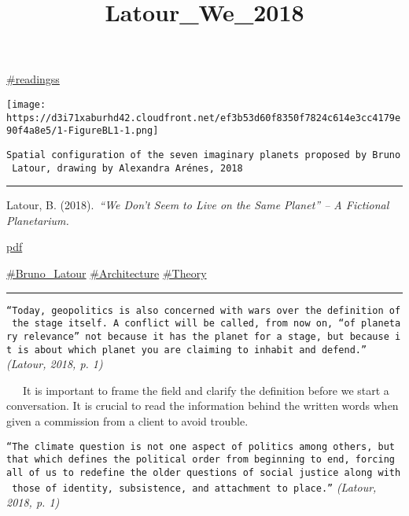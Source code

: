 \documentclass[
]{article}
\title{Latour\_We\_2018}
\author{}
\date{}
\begin{document}
\maketitle

\href{/Users/zhangwei/Documents/ThesisLog/Reading\%20notes/index.html\#readingss}{\#readingss}

\texttt{[image: https://d3i71xaburhd42.cloudfront.net/ef3b53d60f8350f7824c614e3cc4179e90f4a8e5/1-FigureBL1-1.png]}

\texttt{Spatial\ configuration\ of\ the\ seven\ imaginary\ planets\ proposed\ by\ Bruno\ Latour,\ drawing\ by\ Alexandra\ Arénes,\ 2018}

\begin{center}\rule{0.5\linewidth}{0.5pt}\end{center}

Latour, B. (2018).~\emph{``We Don't Seem to Live on the Same Planet'' --
A Fictional Planetarium.}

\href{http://www.bruno-latour.fr/sites/default/files/162-SEVEN-PLANETS-CZpdf.pdf}{pdf}

\href{/Users/zhangwei/Documents/ThesisLog/Reading\%20notes/index.html\#Bruno_Latour}{\#Bruno\_Latour}
\href{/Users/zhangwei/Documents/ThesisLog/Reading\%20notes/index.html\#Architecture}{\#Architecture}
\href{/Users/zhangwei/Documents/ThesisLog/Reading\%20notes/index.html\#Theory}{\#Theory}

\begin{center}\rule{0.5\linewidth}{0.5pt}\end{center}

\texttt{“Today,\ geopolitics\ is\ also\ concerned\ with\ wars\ over\ the\ definition\ of\ the\ stage\ itself.\ A\ conflict\ will\ be\ called,\ from\ now\ on,\ “of\ planetary\ relevance”\ not\ because\ it\ has\ the\ planet\ for\ a\ stage,\ but\ because\ it\ is\ about\ which\ planet\ you\ are\ claiming\ to\ inhabit\ and\ defend.”}
\emph{(Latour, 2018, p. 1)}

~~~It is important to frame the field and clarify the definition before
we start a conversation. It is crucial to read the information behind
the written words when given a commission from a client to avoid
trouble.

\texttt{“The\ climate\ question\ is\ not\ one\ aspect\ of\ politics\ among\ others,\ but\ that\ which\ defines\ the\ political\ order\ from\ beginning\ to\ end,\ forcing\ all\ of\ us\ to\ redefine\ the\ older\ questions\ of\ social\ justice\ along\ with\ those\ of\ identity,\ subsistence,\ and\ attachment\ to\ place.”}
\emph{(Latour, 2018, p. 1)}
\end{document}
